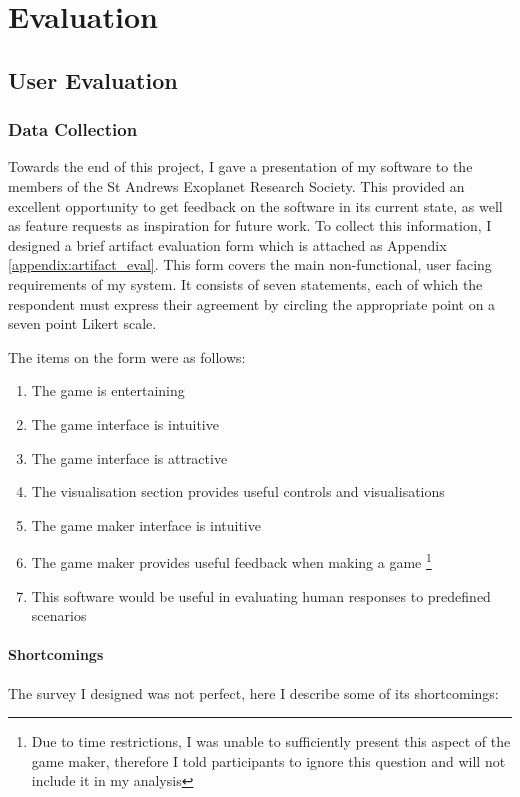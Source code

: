 \chapter{Evaluation}

\section{User Evaluation}

\subsection{Data Collection}
Towards the end of this project, I gave a presentation of my software to the members \cite{CfESMembers} of the St Andrews Exoplanet Research Society. This provided an excellent opportunity to get feedback on the software in its current state, as well as feature requests as inspiration for future work. To collect this information, I designed a brief artifact evaluation form which is attached as Appendix \ref{appendix:artifact_eval}. This form covers the main non-functional, user facing requirements of my system. It consists of seven statements, each of which the respondent must express their agreement by circling the appropriate point on a seven point Likert scale.

The items on the form were as follows:
\begin{enumerate}[label=\textbf{it.\arabic*}]
    \item\label{i:gent} The game is entertaining
    \item\label{i:gint} The game interface is intuitive
    \item\label{i:gatt} The game interface is attractive
    \item\label{i:vis} The visualisation section provides useful controls and visualisations
    \item\label{i:gmint} The game maker interface is intuitive
    \item\label{i:gmuse} The game maker provides useful feedback when making a game \footnote{Due to time restrictions, I was unable to sufficiently present this aspect of the game maker, therefore I told participants to ignore this question and will not include it in my analysis}
    \item\label{i:s} This software would be useful in evaluating human responses to predefined scenarios
\end{enumerate}

\subsubsection{Shortcomings}
The survey I designed was not perfect, here I describe some of its shortcomings:

